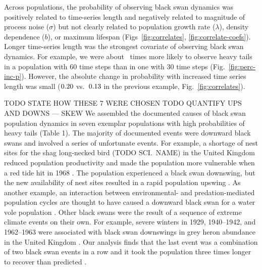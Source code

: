 Across populations, the probability of observing black swan dynamics was positively related to time-series length and negatively related to magnitude of process noise ($\sigma$) but not clearly related to population growth rate ($\lambda$), density dependence ($b$), or maximum lifespan (Figs~\ref{fig:correlates}, \ref{fig:correlate-coefs}). Longer time-series length was the strongest covariate of observing black swan dynamics. For example, we were about \pIncHeavyNThirtyNSixty~times more likely to observe heavy tails in a population with 60 time steps than in one with 30 time steps (Fig.~\ref{fig:perc-inc-p}). However, the absolute change in probability with increased time series length was small ($0.20$ vs.\ $0.13$ in the previous example, Fig.~\ref{fig:correlates}).

TODO STATE HOW THESE 7 WERE CHOSEN
TODO QUANTIFY UPS AND DOWNS --- SKEW
We assembled the documented causes of black swan population dynamics in seven exemplar populations with high probabilities of heavy tails (Table 1). The majority of documented events were downward black swans and involved a series of unfortunate events. For example, a shortage of nest sites for the shag long-necked bird (TODO SCI.\ NAME) in the United Kingdom reduced population productivity and made the population more vulnerable when a red tide hit in 1968 \citep{potts1980}. The population experienced a black swan downswing, but the new availability of nest sites resulted in a rapid population upswing \citep{potts1980}. As another example, an interaction between environmental- and predation-mediated population cycles are thought to have caused a downward black swan for a water vole population \citep{saucy1994}. Other black swans were the result of a sequence of extreme climate events on their own. For example, severe winters in 1929, 1940--1942, and 1962--1963 were associated with black swan downswings in grey heron abundance in the United Kingdom \citep{stafford1971}. Our analysis finds that the last event was a combination of two black swan events in a row and it took the population three times longer to recover than predicted \citep{stafford1971}.


